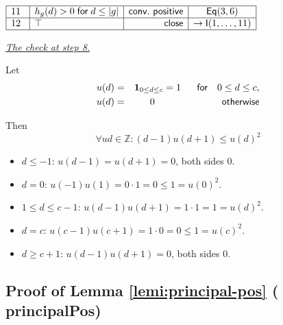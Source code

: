 \documentclass[11pt,reqno]{amsart}
\providecommand{\Z}{\mathbb{Z}}
\begin{document}
\nointerlineskip\noindent$%
\begin{array}{|m{0.5cm}|l|r|c|}
\hline
11 & h_{g}(d)>0\;\mathsf{for}\;d\le|g| & \mathsf{conv.\ positive} & \mathsf{%
Eq}(3,6) \\ \hline
12 & \top & \mathsf{close} & \to\mathsf{I}(1,\dots,11) \\ \hline
\end{array}%
$

\medskip 

\bigskip 
\medskip%

\noindent \underline{\textit{The check at step 8.} }

\bigskip 
\medskip%

\noindent%
Let 
\begin{eqnarray*}
u(d) &=&\mathbf{1}_{0\leq d\leq c}=\text{1\ \ \ \ \ \textsf{for \ \ }}0\leq
d\leq c, \\
u(d) &=&0\text{ \ \ \ \ \ \ \ \ \ \ \ \ \ \ \ \ \ \ \ \ \textsf{otherwise}}
\end{eqnarray*}

\noindent%
Then%
\begin{equation*}
\forall ud\in \Z:(d-1)u(d+1)\leq u(d)^{2}
\end{equation*}

\begin{itemize}
\item $d\le -1$: $u(d-1)=u(d+1)=0$, both sides 0.

\item $d=0$: $u(-1)u(1)=0\cdot 1=0\le 1=u(0)^{2}$.

\item $1\le d\le c-1$: $u(d-1)u(d+1)=1\cdot 1=1=u(d)^{2}$.

\item $d=c$: $u(c-1)u(c+1)=1\cdot 0=0\le 1=u(c)^{2}$.

\item $d\ge c+1$: $u(d-1)u(d+1)=0$, both sides 0.
\end{itemize}

\medskip

\subsection*{Proof of Lemma \protect\ref{lemi:principal-pos} (\textsf{%
principalPos})}
\end{document}
